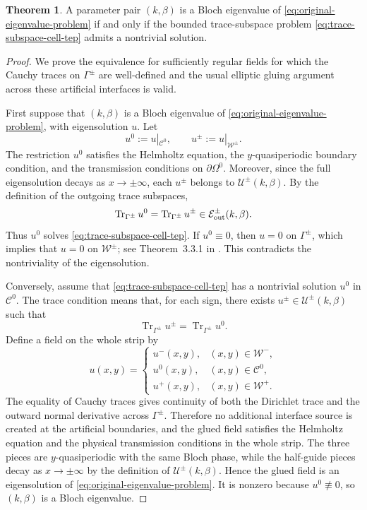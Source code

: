 \documentclass[11pt,fleqn]{article}
\theoremstyle{definition}
\newtheorem{theorem}{Theorem}
\theoremstyle{remark}
\begin{document}
\begin{theorem}
  A parameter pair $(k,\beta)$ is a Bloch eigenvalue of
  \eqref{eq:original-eigenvalue-problem} if and only if the bounded
  trace-subspace problem \eqref{eq:trace-subspace-cell-tep} admits a
  nontrivial solution.
\end{theorem}

\begin{proof}
We prove the equivalence for sufficiently regular fields for which the Cauchy
traces on \(\Gamma^\pm\) are well-defined and the usual elliptic gluing
argument across these artificial interfaces is valid.

First suppose that \((k,\beta)\) is a Bloch eigenvalue of
\eqref{eq:original-eigenvalue-problem}, with eigensolution \(u\). Let
\[
  u^0:=u|_{\mathcal C^0},\qquad
  u^\pm:=u|_{\mathcal W^\pm}.
\]
The restriction \(u^0\) satisfies the Helmholtz equation, the
\(y\)-quasiperiodic boundary condition, and the transmission conditions on
\(\partial\Omega^0\). Moreover, since the full eigensolution decays as
\(x\to\pm\infty\), each \(u^\pm\) belongs to
\(\mathcal U^\pm(k,\beta)\). By the definition of the outgoing trace subspaces,
\[
  \operatorname{Tr}_{\Gamma^\pm}u^0
  =
  \operatorname{Tr}_{\Gamma^\pm}u^\pm
  \in
  \mathcal E^\pm_{\rm out}(k,\beta).
\]
Thus \(u^0\) solves \eqref{eq:trace-subspace-cell-tep}. If $u^0\equiv0$, then $u = 0$ on $\Gamma^\pm$, which implies that $u = 0$ on $\mathcal{W}^\pm$; see Theorem~3.3.1 in \cite{Isakov2017}. This
contradicts the nontriviality of the eigensolution.

Conversely, assume that \eqref{eq:trace-subspace-cell-tep} has a nontrivial
solution \(u^0\) in \(\mathcal C^0\). The trace condition means that, for each
sign, there exists \(u^\pm\in\mathcal U^\pm(k,\beta)\) such that
\[
  \operatorname{Tr}_{\Gamma^\pm}u^\pm
  =
  \operatorname{Tr}_{\Gamma^\pm}u^0.
\]
Define a field on the whole strip by
\[
  u(x,y)=
  \begin{cases}
    u^-(x,y), & (x,y)\in \mathcal W^-,\\
    u^0(x,y), & (x,y)\in \mathcal C^0,\\
    u^+(x,y), & (x,y)\in \mathcal W^+.
  \end{cases}
\]
The equality of Cauchy traces gives continuity of both the Dirichlet trace and
the outward normal derivative across \(\Gamma^\pm\). Therefore no additional
interface source is created at the artificial boundaries, and the glued field
satisfies the Helmholtz equation and the physical transmission conditions in
the whole strip. The three pieces are \(y\)-quasiperiodic with the same Bloch
phase, while the half-guide pieces decay as \(x\to\pm\infty\) by the definition
of \(\mathcal U^\pm(k,\beta)\). Hence the glued field is an eigensolution of
\eqref{eq:original-eigenvalue-problem}. It is nonzero because
\(u^0\not\equiv0\), so \((k,\beta)\) is a Bloch eigenvalue.
\end{proof}
\end{document}
